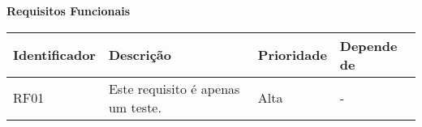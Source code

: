 \documentclass[a4paper, 12pt]{article}
\begin{document}
	
		
	\begin{landscape}
		
		\noindent \textbf{Requisitos Funcionais}
		
		\begin{table}[htp]
			\begin{center}
				\begin{tabular}{|p{3cm}|p{12.5cm}|p{2.5cm}|p{6cm}|}
					\hline
					\textbf{Identificador} & \textbf{Descrição} & \textbf{Prioridade} & \textbf{Depende de} \\
					\hline
					RF01 & Este requisito é apenas um teste. & Alta & - \\
					\hline
				\end{tabular}
			\end{center}
		\end{table}
	\end{landscape}
	
	
	
	
\end{document}
